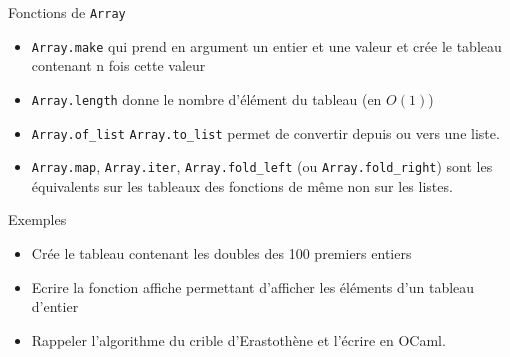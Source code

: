 \documentclass[10pt]{beamer}
\begin{document}
\begin{frame}[fragile]{\Ctitle}{\stitle}
    \begin{block}{Fonctions de {\tt Array}}
    \begin{itemize}
        \item<1-> \texttt{Array.make} qui prend en argument un entier et une valeur et crée le tableau contenant n fois cette valeur
        \item<2-> \texttt{Array.length} donne le nombre d'élément du tableau (en $O(1)$)
        \item<3-> \texttt{Array.of_list} \texttt{Array.to_list} permet de convertir depuis ou vers une liste.
        \item<4-> \texttt{Array.map}, \texttt{Array.iter}, \texttt{Array.fold_left} (ou \texttt{Array.fold_right}) sont les équivalents sur les tableaux des fonctions de même non sur les listes.
    \end{itemize}
\end{block}
\end{frame}

\begin{frame}[fragile]{\Ctitle}{\stitle}
    \begin{exampleblock}{Exemples}
    \begin{itemize}
        \item<1-> Crée le tableau contenant les doubles des 100 premiers entiers
        \item<2-> Ecrire la fonction affiche permettant d'afficher les éléments d'un tableau d'entier
        \item<3-> Rappeler l'algorithme du crible d'Erastothène et l'écrire en OCaml.
    \end{itemize}
    \end{exampleblock}
\end{frame}
\end{document}

